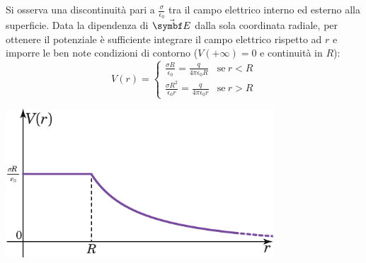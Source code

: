 Si osserva una discontinuità pari a $\frac{\sigma}{\epsilon_0}$ tra il campo elettrico interno ed esterno alla superficie.
Data la dipendenza di $\vba{E}$ dalla sola coordinata radiale, per ottenere il potenziale è sufficiente integrare il campo elettrico rispetto ad $r$ e imporre le ben note condizioni di contorno ($V(+\infty)=0$ e continuità in $R$):
\begin{equation}
	V(r)=
	\begin{cases}
	\frac{\sigma R}{\epsilon_0}=\frac{q}{4\pi\epsilon_0 R}&\text{se}\ r< R\\
	\frac{\sigma R^2}{\epsilon_0 r}=\frac{q}{4\pi\epsilon_0 r}&\text{se}\ r> R
	\end{cases}
\end{equation}
\begin{center}
	\includegraphics[width=0.75\textwidth]{images/chp3/chp3sferacavagraf2.pdf}
\end{center}
